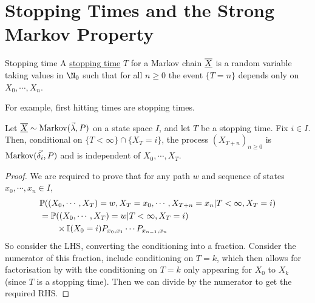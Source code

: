 \documentclass[../Main.tex]{subfiles}
\begin{document}
\section{Stopping Times and the Strong Markov Property}
\begin{definition}{Stopping time}
    A \underline{stopping time} $T$ for a Markov chain $\underline{\overline{X}}$ is a random variable taking values in $\N_0$ such that for all $n \geq 0$ the event $\{T = n\}$ depends only on $X_0, \cdots, X_n$.
\end{definition}
For example, first hitting times are stopping times.
\begin{theorem}
    Let $\underline{\overline{X}} \sim \operatorname{Markov}(\vec{\lambda}, P)$ on a state space $I$, and let $T$ be a stopping time. Fix $i \in I$. Then, conditional on $\{T < \infty\} \cap \{X_T = i\}$, the process $(X_{T + n})_{n \geq 0}$ is $\operatorname{Markov}(\vec{\delta_i}, P)$ and is independent of $X_0, \cdots, X_T$.
    \label{thmStrongMarkov}
\end{theorem}
\begin{proof}
    We are required to prove that for any path $w$ and sequence of states $x_0, \cdots, x_n \in I$,
    \begin{align*}
        &\mathbb{P}((X_0, \cdots, X_T) = w, X_T = x_0, \cdots, X_{T + n} = x_n | T < \infty, X_T = i) \\
        &= \mathbb{P}((X_0, \cdots, X_T) = w | T < \infty, X_T = i) \\
        &\qquad\times \mathbb{I}(X_0 = i) P_{x_{0}, x_{1}} \cdots P_{x_{n-1}, x_{n}}
    \end{align*}
    So consider the LHS, converting the conditioning into a fraction. Consider the numerator of this fraction, include conditioning on $T = k$, which then allows for factorisation by  with the conditioning on $T = k$ only appearing for $X_0$ to $X_k$ (since $T$ is a stopping time). Then we can divide by the numerator to get the required RHS.
\end{proof}
\end{document}
